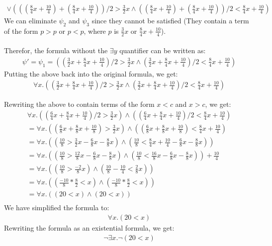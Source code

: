 \documentclass[12pt,letterpaper, onecolumn]{exam}
\begin{document}
\begin{questions}
\begin{align*}
				\lor (((\frac{8}{4}x + \frac{10}{4}) + (\frac{8}{4}x + \frac{10}{4})) / 2 > \frac{3}{2}x \land ((\frac{8}{4}x + \frac{10}{4}) + (\frac{8}{4}x + \frac{10}{4})) / 2 < \frac{8}{4}x + \frac{10}{4})
	\end{align*}
	We can eliminate $ \psi_2 $ and $ \psi_3 $ since they cannot be satisfied (They contain a term of the form $ p > p $ or $ p < p $, where $ p $ is $\frac{3}{2}x$ or $\frac{8}{4}x + \frac{10}{4}$). \\ \\
	Therefor, the formula without the $ \exists y $ quantifier can be written as:
	\begin{align*}
		\psi' = \psi_1
		      = ((\frac{3}{2}x + \frac{8}{4}x + \frac{10}{4}) / 2 > \frac{3}{2}x \land (\frac{3}{2}x + \frac{8}{4}x + \frac{10}{4}) / 2 < \frac{8}{4}x + \frac{10}{4})
	\end{align*}
	Putting the above back into the original formula, we get:
	\begin{align*}
		\forall x. ((\frac{3}{2}x + \frac{8}{4}x + \frac{10}{4}) / 2 > \frac{3}{2}x \land (\frac{3}{2}x + \frac{8}{4}x + \frac{10}{4}) / 2 < \frac{8}{4}x + \frac{10}{4})
	\end{align*}

	Rewriting the above to contain terms of the form $ x < c $ and $ x > c $, we get:
	\begin{align*}
		\forall x. ((\frac{6}{4}x + \frac{8}{4}x + \frac{10}{4}) / 2 > \frac{3}{2}x) \land ((\frac{6}{4}x + \frac{8}{4}x + \frac{10}{4}) / 2 < \frac{8}{4}x + \frac{10}{4}) \\
		= \forall x. ((\frac{6}{8}x + \frac{8}{8}x + \frac{10}{8}) > \frac{3}{2}x) \land ((\frac{6}{8}x + \frac{8}{8}x + \frac{10}{8}) < \frac{8}{4}x + \frac{10}{4}) \\
		= \forall x. ((\frac{10}{8} > \frac{3}{2}x - \frac{6}{8}x - \frac{8}{8}x) \land (\frac{10}{8} < \frac{8}{4}x + \frac{10}{4} - \frac{6}{8}x - \frac{8}{8}x)) \\
		= \forall x. ((\frac{10}{8} > \frac{12}{8}x - \frac{6}{8}x - \frac{8}{8}x) \land (\frac{10}{8} < \frac{16}{8}x - \frac{6}{8}x - \frac{8}{8}x)) + \frac{10}{4} \\  
		= \forall x. ((\frac{10}{8} > \frac{-2}{8}x) \land (\frac{10}{8} - \frac{10}{4} < \frac{2}{8}x)) \\
		= \forall x. ((\frac{-10}{8} * \frac{8}{2} < x) \land (\frac{-10}{8} * \frac{8}{2} < x)) \\
		= \forall x. (({20} < x) \land ({20} < x)) \\
	\end{align*}
	We have simplified the formula to:
	\begin{align*}
		\forall x. (20 < x)
	\end{align*}
	Rewriting the formula as an existential formula, we get:
	\begin{align*}
		\neg \exists x. \neg (20 < x)
	\end{align*}
	

\end{questions}
\end{document}
